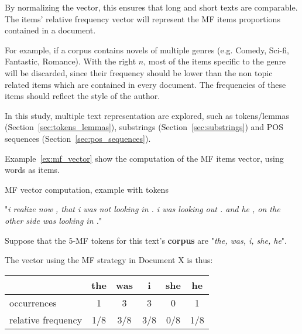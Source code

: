 By normalizing the vector, this ensures that long and short texts are comparable.
The items' relative frequency vector will represent the MF items proportions contained in a document.

For example, if a corpus contains novels of multiple genres (e.g. Comedy, Sci-fi, Fantastic, Romance).
With the right $n$, most of the items specific to the genre will be discarded, since their frequency should be lower than the non topic related items which are contained in every document.
The frequencies of these items should reflect the style of the author.

In this study, multiple text representation are explored, such as tokens/lemmas (Section~\ref{sec:tokens_lemmas}), substrings (Section~\ref{sec:substrings}) and POS sequences (Section~\ref{sec:pos_sequences}).

Example~\ref{ex:mf_vector} show the computation of the MF items vector, using words as items.

\begin{example}
  \centering
  \caption{MF vector computation, example with tokens}
  \label{ex:mf_vector}

  \begin{subexample}{\linewidth}
    "\textit{i realize now , that i was not looking in . i was looking out . and he , on the other side was looking in .}"\cite{ddlc}
  \end{subexample}

  \vspace{0.5cm}

  \begin{subexample}{\linewidth}
    Suppose that the $5$-MF tokens for this text's \textbf{corpus} are "\textit{the, was, i, she, he}".

    The vector using the MF strategy in Document X is thus:
    \vspace{0.2cm}

    \centering
    \begin{tabular}{l c c c c c}
      \toprule
                         & the & was & i   & she & he  \\
      \midrule
      occurrences        & 1   & 3   & 3   & 0   & 1   \\
      relative frequency & 1/8 & 3/8 & 3/8 & 0/8 & 1/8 \\
      \bottomrule
    \end{tabular}
  \end{subexample}
\end{example}

